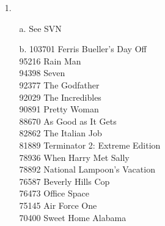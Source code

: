 \documentclass{article}
\begin{document}
\begin{itemize}
\item[1.] 
	\begin{itemize}
		\item[a.] See SVN
		\item[b.] 
		103701	Ferris Bueller's Day Off\\
		95216	Rain Man\\
		94398	Seven\\
		92377	The Godfather\\
		92029	The Incredibles\\
		90891	Pretty Woman\\
		88670	As Good as It Gets\\
		82862	The Italian Job\\
		81889	Terminator 2: Extreme Edition\\
		78936	When Harry Met Sally\\
		78892	National Lampoon's Vacation\\
		76587	Beverly Hills Cop\\
		76473	Office Space\\
		75145	Air Force One\\
		70400	Sweet Home Alabama
	\end{itemize}


\end{itemize}
\end{document}
